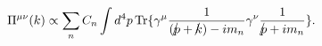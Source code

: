 \begin{equation}
\Pi^{\mu\nu}(k) \propto \sum_n C_n \int d^4p \, {\rm
Tr}\{\gamma^\mu{1 \over
{({p\kern-0.15em\raise0.17ex\llap{/}\kern0.15em\relax} +
{k\kern-0.15em\raise0.17ex\llap{/}\kern0.15em\relax}) -i m_n }}
\gamma^\nu {1 \over
{{p\kern-0.15em\raise0.17ex\llap{/}\kern0.15em\relax} +i m_n}}\}.
\label{e1}
\end{equation}

